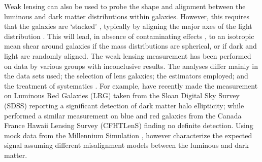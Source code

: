 \documentclass[useAMS,usenatbib]{mn2e}
\begin{document}
Weak lensing can also be used to probe the shape and alignment between the luminous and dark matter distributions within galaxies. However, this requires that the galaxies are `stacked' \citep{2000astro.ph..6281B,2000ApJ...538L.113N}, typically by aligning the major axes of the light distribution \citep[e.g.][]{2004ApJ...606...67H}. This will lead, in absence of contaminating effects \citep[e.g. intrinsic alignments][]{2004PhRvD..70f3526H}, to an isotropic mean shear around galaxies if the mass distributions are spherical, or if dark and light are randomly aligned. The weak lensing measurement has been performed on data by various groups \citep[][]{2004ApJ...606...67H,2006MNRAS.370.1008M,2007ApJ...669...21P,2012A&A...545A..71V} with inconclusive results. The analyses differ mainly in the data sets used; the selection of lens galaxies; the estimators employed; and the treatment of systematics \citep[see e.g.][]{2015arXiv150704301S}. For example, \citet{2015arXiv150603536C} have recently made the measurement on Luminous Red Galaxies (LRG) taken from the Sloan Digital Sky Survey (SDSS) reporting a significant detection of dark matter halo ellipticity; while \citet{2015arXiv150704301S} performed a similar measurement on blue and red galaxies from the Canada France Hawaii Lensing Survey (CFHTLenS) finding no definite detection. Using mock data from the Millennium Simulation \citep{2005Natur.435..629S}, \citet{2015arXiv150704301S} however characterize the expected signal assuming different misalignment models between the luminous and dark matter.


\end{document}
